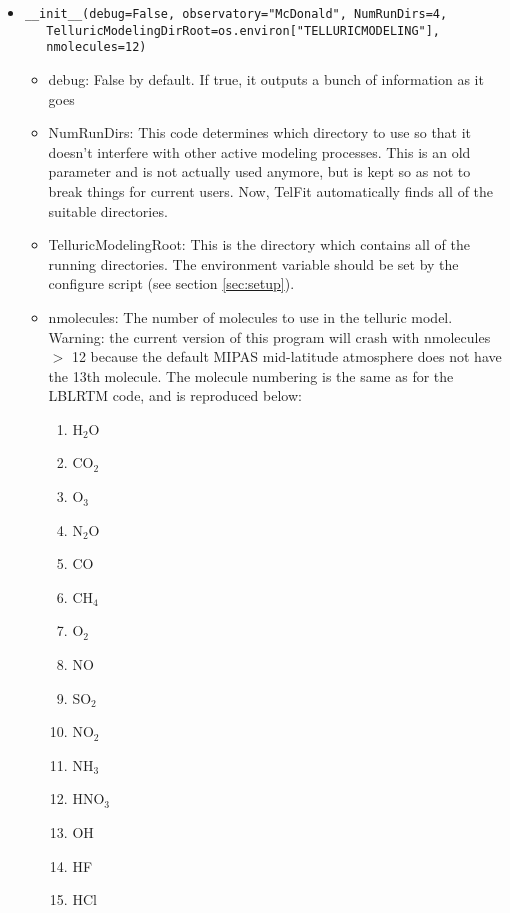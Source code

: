 \documentclass{article}
\begin{document}
\begin{itemize}
\item \begin{Verbatim}[commandchars=\\\{\}]
__init__(debug=False, observatory="McDonald", NumRunDirs=4,
   TelluricModelingDirRoot=os.environ["TELLURICMODELING"], 
   nmolecules=12)
\end{Verbatim}
  \begin{itemize}
  \item debug: False by default. If true, it outputs a bunch of information as it goes
  \item NumRunDirs: This code determines which directory to use so that it doesn't interfere with other active modeling processes. This is an old parameter and is not actually used anymore, but is kept so as not to break things for current users. Now, TelFit automatically finds all of the suitable directories.
  \item TelluricModelingRoot: This is the directory which contains all of the running directories. The environment variable should be set by the configure script (see section \ref{sec:setup}).
  \item nmolecules: The number of molecules to use in the telluric model. Warning: the current version of this program will crash with nmolecules $>$ 12 because the default MIPAS mid-latitude atmosphere does not have the 13th molecule. The molecule numbering is the same as for the LBLRTM code, and is reproduced below:
  \begin{enumerate}
                \item   H$_2$O
                \item   CO$_2$
                \item   O$_3$
                \item   N$_2$O
                \item   CO
                \item   CH$_4$
                \item   O$_2$
                \item   NO
                \item   SO$_2$
                \item   NO$_2$
                \item   NH$_3$
                \item   HNO$_3$
                \item   OH
                \item   HF
                \item   HCl

\end{enumerate}
\end{itemize}
\end{itemize}
\end{document}
